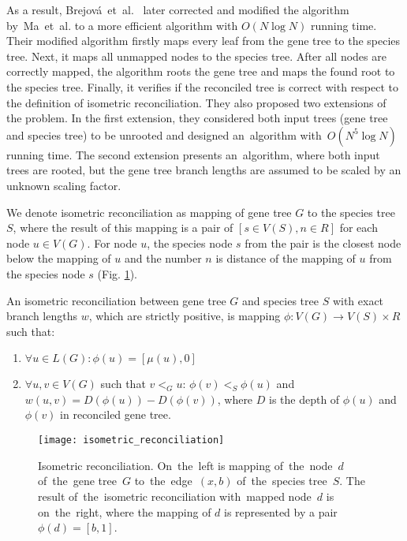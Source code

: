 As a result, Brejová~et~al.~\cite{brejova} later corrected and modified the algorithm by~Ma~et~al. to a more efficient algorithm with $O(N \log N)$ running time. Their modified algorithm firstly maps every leaf from the gene tree to the species tree. Next, it maps all unmapped nodes to the species tree. After all nodes are correctly mapped, the algorithm roots the gene tree and maps the found root to the species tree. Finally, it verifies if the reconciled tree is correct with respect to the definition of isometric reconciliation. They also proposed two extensions of the problem. In the first extension, they considered both input trees (gene tree and species tree) to be unrooted and designed an~algorithm with~$O(N^5 \log N)$ running time. The second extension presents an~algorithm, where both input trees are rooted, but the gene tree branch lengths are assumed to be scaled by an unknown scaling factor.

We denote isometric reconciliation as mapping of gene tree $G$ to the species tree $S$, where the result of this mapping is a pair of $[s \in V(S), n \in R]$ for each node $u \in V(G)$. For node $u$, the species node $s$ from the pair is the closest node below the mapping of $u$ and the number $n$ is distance of the mapping of $u$ from the species node $s$ (Fig. \ref{isometric_reconciliation}).

\begin{definition}
An isometric reconciliation between gene tree $G$ and species tree $S$ with exact branch lengths $w$, which are strictly positive, is mapping $\phi: V(G) \rightarrow V(S) \times R$ such that:
	\begin{enumerate}\itemsep0em
	\item $\forall u \in L(G): \phi(u) = [\mu(u), 0]$
	\item $\forall u, v \in V(G)$ such that $v<_Gu$: $\phi(v)<_S\phi(u)$ and $w(u, v) = D(\phi(u)) - D(\phi(v))$, where $D$ is the depth of $\phi(u)$ and $\phi(v)$ in reconciled gene tree.
	\end{enumerate}
\end{definition}

\begin{figure}[ht!]
	\centering
  	\texttt{[image: isometric\_reconciliation]}
  	\caption[Isometric reconciliation]{Isometric reconciliation. On~the~left is mapping of~the~node~$d$ of~the~gene tree~$G$ to~the~edge~$(x, b)$ of~the~species tree~$S$. The result of~the~isometric reconciliation with~mapped node~$d$ is on~the~right, where the mapping of $d$ is represented by a pair $\phi(d) = [b, 1]$.}
  	\label{isometric_reconciliation}
\end{figure}


